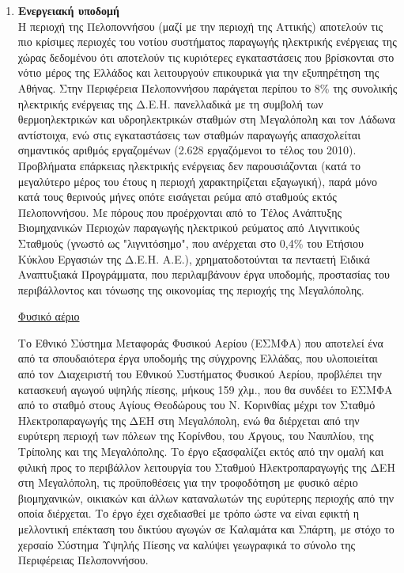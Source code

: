 \documentclass[12pt]{article}
\begin{document}
\begin{enumerate}
		\item \textbf{Ενεργειακή υποδομή} \\
		Η περιοχή της Πελοποννήσου (μαζί με την περιοχή της Αττικής) αποτελούν τις πιο κρίσιμες περιοχές του νοτίου συστήματος παραγωγής ηλεκτρικής ενέργειας της χώρας δεδομένου ότι αποτελούν τις κυριότερες εγκαταστάσεις που βρίσκονται στο νότιο μέρος της Ελλάδος και λειτουργούν επικουρικά για την εξυπηρέτηση της Αθήνας. Στην Περιφέρεια Πελοποννήσου παράγεται περίπου το 8\% της συνολικής ηλεκτρικής ενέργειας της Δ.Ε.Η. πανελλαδικά με τη συμβολή των θερμοηλεκτρικών και υδροηλεκτρικών σταθμών στη Μεγαλόπολη και τον Λάδωνα αντίστοιχα, ενώ στις εγκαταστάσεις των σταθμών παραγωγής απασχολείται σημαντικός αριθμός εργαζομένων (2.628 εργαζόμενοι το τέλος του 2010). Προβλήματα επάρκειας ηλεκτρικής ενέργειας δεν παρουσιάζονται (κατά το μεγαλύτερο μέρος του έτους η περιοχή χαρακτηρίζεται εξαγωγική), παρά μόνο κατά τους θερινούς μήνες οπότε εισάγεται ρεύμα από σταθμούς εκτός Πελοποννήσου. Με πόρους που προέρχονται από το Τέλος Ανάπτυξης Βιομηχανικών Περιοχών παραγωγής ηλεκτρικού ρεύματος από Λιγνιτικούς Σταθμούς (γνωστό ως "λιγνιτόσημο", που ανέρχεται στο 0,4\% του Ετήσιου Κύκλου Εργασιών της Δ.Ε.Η. Α.Ε.), χρηματοδοτούνται τα πενταετή Ειδικά Αναπτυξιακά Προγράμματα, που περιλαμβάνουν έργα υποδομής, προστασίας του περιβάλλοντος και τόνωσης της οικονομίας της περιοχής της Μεγαλόπολης.
		
		\underline{Φυσικό αέριο}
		
		Το Εθνικό Σύστημα Μεταφοράς Φυσικού Αερίου (ΕΣΜΦΑ) που αποτελεί ένα από τα σπουδαιότερα έργα υποδομής της σύγχρονης Ελλάδας, που υλοποιείται από τον Διαχειριστή του Εθνικού Συστήματος Φυσικού Αερίου, προβλέπει την κατασκευή αγωγού υψηλής πίεσης, μήκους 159 χλμ., που θα συνδέει το ΕΣΜΦΑ από το σταθμό στους Αγίους Θεοδώρους του Ν. Κορινθίας μέχρι τον Σταθμό Ηλεκτροπαραγωγής της ΔΕΗ στη Μεγαλόπολη, ενώ θα διέρχεται από την ευρύτερη περιοχή των πόλεων της Κορίνθου, του Άργους, του Ναυπλίου, της Τρίπολης και της Μεγαλόπολης. Το έργο εξασφαλίζει εκτός από την ομαλή και φιλική προς το περιβάλλον λειτουργία του Σταθμού Ηλεκτροπαραγωγής της ΔΕΗ στη Μεγαλόπολη, τις προϋποθέσεις για την τροφοδότηση με φυσικό αέριο βιομηχανικών, οικιακών και άλλων καταναλωτών της ευρύτερης περιοχής από την οποία διέρχεται. Το έργο έχει σχεδιασθεί με τρόπο ώστε να είναι εφικτή η μελλοντική επέκταση του δικτύου αγωγών σε Καλαμάτα και Σπάρτη, με στόχο το χερσαίο Σύστημα Υψηλής Πίεσης να καλύψει γεωγραφικά το σύνολο της Περιφέρειας Πελοποννήσου.
		

\end{enumerate}
\end{document}
